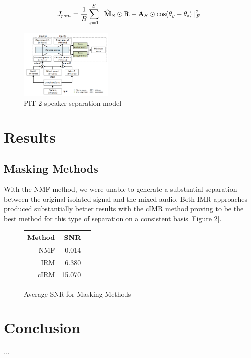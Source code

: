 \documentclass[journal, a4paper]{IEEEtran}
\begin{document}
\begin{equation}
J_{psm} = \dfrac{1}{B} \sum_{s=1}^S || \Hat{\mathbf{M}}_S \odot \mathbf{R} - \mathbf{A}_S \odot \cos(\theta_y - \theta_s) ||^2_F  
\end{equation}

\begin{figure}[h!]
    \centering  
     \caption{\label{fig:pit_diagram}PIT 2 speaker separation model}  
    \includegraphics[width=0.4\textwidth]{PIT.png}  
\end{figure}



\section{Results}

\subsection{Masking Methods}

With the NMF method, we were unable to generate a substantial separation between the original isolated signal and the mixed audio. Both IMR approaches produced substantially better results with the cIMR method proving to be the best method for this type of separation on a consistent basis [Figure \ref{Fig:masking_snr}].


\begin{figure}[h!]
    \centering  
     \caption{\label{Fig:masking_snr}Average SNR for Masking Methods}  

  \begin{tabular}{r r r}\\
  
        Method & SNR \\
        \midrule
        NMF & 0.014 \\
        IRM & 6.380 \\
        cIRM & 15.070 \\
        \midrule
    \end{tabular}
    
\end{figure}



\section{Conclusion}
...
\newline 



\end{document}
